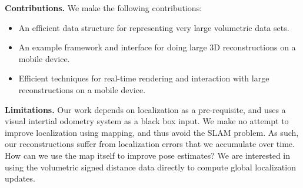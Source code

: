 \documentclass[conference,letterpaper]{IEEEtran}
\begin{document}
\textbf{Contributions.} 
We make the following contributions:
\begin{itemize}
\item{An efficient data structure for representing very large volumetric data
sets.}
\item {An example framework and interface for doing large 3D reconstructions on
a mobile device.}
\item {Efficient techniques for real-time rendering and interaction with large
reconstructions on a mobile device.}
\end{itemize}

\textbf{Limitations.}
Our work depends on localization as a pre-requisite, and uses a visual intertial
odometry system as a black box input.  We make no attempt to improve
localization using mapping, and thus avoid the SLAM problem.  As such, our
reconstructions suffer from localization errors that we accumulate over time.
How can we use the map itself to improve pose estimates? We are interested in
using the volumetric signed distance data directly to compute global  
localization updates. 
\end{document}
